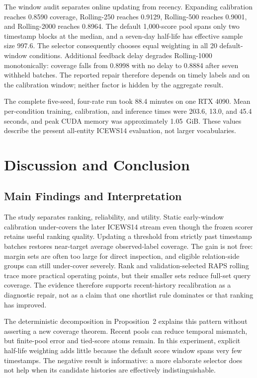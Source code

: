 The window audit separates online updating from recency. Expanding calibration
reaches 0.8590 coverage, Rolling-250 reaches 0.9129, Rolling-500 reaches 0.9001,
and Rolling-2000 reaches 0.8964. The default 1,000-score pool spans only two
timestamp blocks at the median, and a seven-day half-life has effective sample
size 997.6. The selector consequently chooses equal weighting in all 20 default-
window conditions. Additional feedback delay degrades Rolling-1000 monotonically:
coverage falls from 0.8998 with no delay to 0.8884 after seven withheld batches.
The reported repair therefore depends on timely labels and on the calibration
window; neither factor is hidden by the aggregate result.

The complete five-seed, four-rate run took 88.4 minutes on one RTX 4090. Mean
per-condition training, calibration, and inference times were 203.6, 13.0, and
45.4 seconds, and peak CUDA memory was approximately 1.05~GiB. These values
describe the present all-entity ICEWS14 evaluation, not larger vocabularies.

\FloatBarrier

\section{Discussion and Conclusion}
\label{sec:discussion}

\subsection{Main Findings and Interpretation}

The study separates ranking, reliability, and utility. Static early-window
calibration under-covers the later ICEWS14 stream even though the frozen scorer
retains useful ranking quality. Updating a threshold from strictly past
timestamp batches restores near-target average observed-label coverage. The
gain is not free: margin sets are often too large for direct inspection, and
eligible relation-side groups can still under-cover severely. Rank and
validation-selected RAPS rolling trace more practical operating points, but
their smaller sets reduce full-set query coverage. The evidence therefore
supports recent-history recalibration as a diagnostic repair, not as a claim
that one shortlist rule dominates or that ranking has improved.

The deterministic decomposition in Proposition~2 explains this pattern without
asserting a new coverage theorem. Recent pools can reduce temporal mismatch,
but finite-pool error and tied-score atoms remain. In this experiment, explicit
half-life weighting adds little because the default score window spans very few
timestamps. The negative result is informative: a more elaborate selector does
not help when its candidate histories are effectively indistinguishable.

